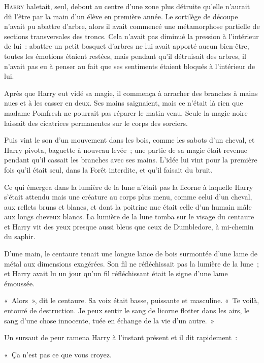 
\lettrine{H}{arry} haletait, seul, debout au centre d'une zone plus détruite qu'elle n'aurait dû l'être par la main d'un élève en première année.
Le sortilège de découpe n'avait pu abattre d'arbre, alors il avait commencé une métamorphose partielle de sections transversales des troncs.
Cela n'avait pas diminué la pression à l'intérieur de lui~: abattre un petit bosquet d'arbres ne lui avait apporté aucun bien-être, toutes les émotions étaient restées, mais pendant qu'il détruisait des arbres, il n'avait pas eu à penser au fait que ses sentiments étaient bloqués à l'intérieur de lui.

Après que Harry eut vidé sa magie, il commença à arracher des branches à mains nues et à les casser en deux.
Ses mains saignaient, mais ce n'était là rien que madame Pomfresh ne pourrait pas réparer le matin venu.
Seule la magie noire laissait des cicatrices permanentes sur le corps des sorciers.

Puis vint le son d'un mouvement dans les bois, comme les sabots d'un cheval, et Harry pivota, baguette à nouveau levée~; une partie de sa magie était revenue pendant qu'il cassait les branches avec ses mains.
L'idée lui vint pour la première fois qu'il était seul, dans la Forêt interdite, et qu'il faisait du bruit.

Ce qui émergea dans la lumière de la lune n'était pas la licorne à laquelle Harry s'était attendu mais une créature au corps plus menu, comme celui d'un cheval, aux reflets bruns et blancs, et dont la poitrine nue était celle d'un humain mâle aux longs cheveux blancs.
La lumière de la lune tomba sur le visage du centaure et Harry vit des yeux presque aussi bleus que ceux de Dumbledore, à mi-chemin du saphir.

D'une main, le centaure tenait une longue lance de bois surmontée d'une lame de métal aux dimensions exagérées.
Son fil ne réfléchissait pas la lumière de la lune~; et Harry avait lu un jour qu'un fil réfléchissant était le signe d'une lame émoussée.

«~Alors~», dit le centaure.
Sa voix était basse, puissante et masculine.
«~Te voilà, entouré de destruction.
Je peux sentir le sang de licorne flotter dans les airs, le sang d'une chose innocente, tuée en échange de la vie d'un autre.~»

Un sursaut de peur ramena Harry à l'instant présent et il dit rapidement~:

«~Ça n'est pas ce que vous croyez.

